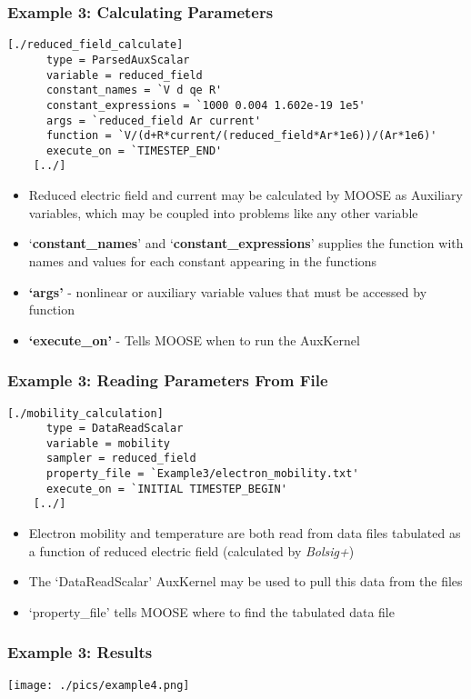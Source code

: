\begin{frame}[fragile]
	\frametitle{Example 3: Calculating Parameters}
		\begin{Verbatim}[fontsize=\scriptsize]
    [./reduced_field_calculate]
      type = ParsedAuxScalar
      variable = reduced_field
      constant_names = `V d qe R'
      constant_expressions = `1000 0.004 1.602e-19 1e5'
      args = `reduced_field Ar current'
      function = `V/(d+R*current/(reduced_field*Ar*1e6))/(Ar*1e6)'
      execute_on = `TIMESTEP_END'
    [../]
	\end{Verbatim}

	\begin{itemize}
		\item Reduced electric field and current may be calculated by MOOSE as Auxiliary variables, which may be coupled into problems like any other variable
		\item `\textbf{constant\_names}' and `\textbf{constant\_expressions}' supplies the function with names and values for each constant appearing in the functions
		\item \textbf{`args'} - nonlinear or auxiliary variable values that must be accessed by function
		\item \textbf{`execute\_on'} - Tells MOOSE when to run the AuxKernel
	\end{itemize}

\end{frame}

\begin{frame}[fragile]
	\frametitle{Example 3: Reading Parameters From File}
		\begin{Verbatim}[fontsize=\footnotesize]
    [./mobility_calculation]
      type = DataReadScalar
      variable = mobility
      sampler = reduced_field
      property_file = `Example3/electron_mobility.txt'
      execute_on = `INITIAL TIMESTEP_BEGIN'
    [../]
	\end{Verbatim}

	\begin{itemize}
		\item Electron mobility and temperature are both read from data files tabulated as a function of reduced electric field (calculated by \textit{Bolsig+})
		\item The `DataReadScalar' AuxKernel may be used to pull this data from the files
		\item `property\_file' tells MOOSE where to find the tabulated data file
	\end{itemize}

\end{frame}

\begin{frame}
	\frametitle{Example 3: Results}
	\centering
	\texttt{[image: ./pics/example4.png]}
\end{frame}